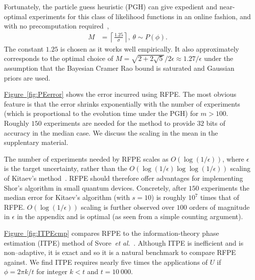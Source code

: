 \documentclass[aps,prl,amsmath,twocolumn,amssymb,superscriptaddress]{revtex4-1}
\newcommand{\app}[1]{the supplentary material}
\newcommand{\fig}[1]{\hyperref[fig:#1]{Figure~\ref*{fig:#1}}}
\newcommand{\etal}{\emph{et al.}}
\newcommand{\ee}{\mathrm{e}}
\begin{document}
Fortunately, the particle guess heuristic (PGH) can give
expedient and
near-optimal experiments for this class of likelihood
functions in an online fashion, and with no precomputation
required~\cite{wiebe_hamiltonian_2014},
\begin{align}
    M &= \left\lceil\frac{1.25}{\sigma}\right\rceil,~
    \theta \sim P(\phi).\label{eq:PGH}
\end{align}
The constant $1.25$ is chosen as it works well empirically.  It also approximately corresponds to the optimal choice of $M=\sqrt{2+2\sqrt 5}/2\epsilon \approx 1.27/\epsilon$ under the assumption that the Bayesian Cramer Rao bound is saturated and Gaussian priors are used.



\fig{PEerror} shows the error incurred using RFPE.  The most obvious feature is that the error shrinks exponentially with the number of experiments (which is proportional to the evolution time under the PGH) for $m>100$.  Roughly $150$ experiments are needed for the method to provide $32$ bits of accuracy in the median case.
We discuss the scaling in the mean in \app{var-reduction}.

The number of experiments needed by RFPE scales as $O(\log(1/\epsilon))$, where $\epsilon$ is the target uncertainty, rather than the $O(\log(1/\epsilon)\log\log(1/\epsilon))$ scaling of Kitaev's method~\cite{Kit96,kitaev2002classical}.  
 RFPE should therefore offer advantages for implementing Shor's algorithm in small quantum devices.
Concretely, after $150$ experiments the median error for Kitaev's algorithm (with $s=10$) is roughly $10^7$ times that of RFPE.  $O(\log(1/\epsilon))$ scaling  is further observed over $100$ orders of magnitude in $\epsilon$ in the appendix and is optimal (as seen from a simple counting argument).





\fig{ITPEcmp} compares RFPE to the information-theory phase estimation (ITPE) method of Svore~\etal~\cite{SHF14}.  Although ITPE is inefficient and is non--adaptive, it is exact and so it is a natural benchmark to compare RFPE against.  We find  ITPE requires nearly five times the applications of $U$ if $\phi=2\pi k/t$ for integer $k<t$ and $t=10~000$.
\end{document}
